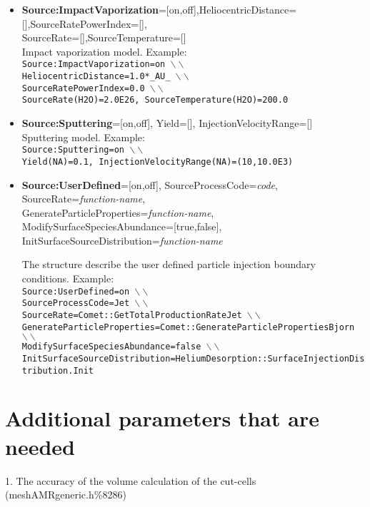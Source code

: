 \begin{itemize}
\item {\bf Source:ImpactVaporization}=[on,off],HeliocentricDistance=[],SourceRatePowerIndex=[], \\ SourceRate=[],SourceTemperature=[] \\ Impact vaporization model. Example: \\ {\tt Source:ImpactVaporization=on $\backslash\backslash$ \\ HeliocentricDistance=1.0*\_AU\_ $\backslash\backslash$ \\ SourceRatePowerIndex=0.0 $\backslash\backslash$ \\ SourceRate(H2O)=2.0E26, SourceTemperature(H2O)=200.0} 

\item {\bf Source:Sputtering}=[on,off], Yield=[], InjectionVelocityRange=[] \\ Sputtering model. Example: \\ {\tt Source:Sputtering=on $\backslash\backslash$ \\ Yield(NA)=0.1, InjectionVelocityRange(NA)=(10,10.0E3)}

\item {\bf Source:UserDefined}=[on,off], SourceProcessCode={\it code}, SourceRate={\it function-name}, \\ GenerateParticleProperties={\it function-name}, ModifySurfaceSpeciesAbundance=[true,false], \\ InitSurfaceSourceDistribution={\it function-name} 

The structure describe the user defined particle injection boundary conditions. Example: \\ {\tt Source:UserDefined=on $\backslash\backslash$ \\ SourceProcessCode=Jet $\backslash\backslash$ \\ SourceRate=Comet::GetTotalProductionRateJet $\backslash\backslash$ \\ GenerateParticleProperties=Comet::GenerateParticlePropertiesBjorn $\backslash\backslash$ \\ ModifySurfaceSpeciesAbundance=false  $\backslash\backslash$ \\ InitSurfaceSourceDistribution=HeliumDesorption::SurfaceInjectionDistribution.Init}



\end{itemize}











     

\section{Additional parameters that are needed} 
1. The accuracy of the volume calculation of the cut-cells (meshAMRgeneric.h\%8286)








